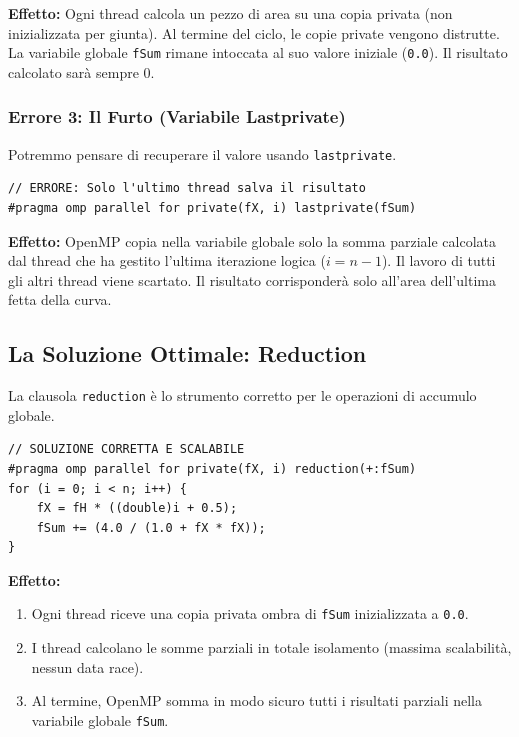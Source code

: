 \textbf{Effetto:} Ogni thread calcola un pezzo di area su una copia privata (non inizializzata per giunta). Al termine del ciclo, le copie private vengono distrutte. La variabile globale \texttt{fSum} rimane intoccata al suo valore iniziale (\texttt{0.0}). Il risultato calcolato sarà sempre $0$.

\subsubsection{Errore 3: Il Furto (Variabile Lastprivate)}
Potremmo pensare di recuperare il valore usando \texttt{lastprivate}.
\begin{verbatim}
// ERRORE: Solo l'ultimo thread salva il risultato
#pragma omp parallel for private(fX, i) lastprivate(fSum)
\end{verbatim}

\textbf{Effetto:} OpenMP copia nella variabile globale solo la somma parziale calcolata dal thread che ha gestito l'ultima iterazione logica ($i = n-1$). Il lavoro di tutti gli altri thread viene scartato. Il risultato corrisponderà solo all'area dell'ultima fetta della curva.

\subsection{La Soluzione Ottimale: Reduction}
La clausola \texttt{reduction} è lo strumento corretto per le operazioni di accumulo globale.
\begin{verbatim}
// SOLUZIONE CORRETTA E SCALABILE
#pragma omp parallel for private(fX, i) reduction(+:fSum)
for (i = 0; i < n; i++) {
    fX = fH * ((double)i + 0.5);
    fSum += (4.0 / (1.0 + fX * fX));
}
\end{verbatim}

\textbf{Effetto:} 
\begin{enumerate}
    \item Ogni thread riceve una copia privata ombra di \texttt{fSum} inizializzata a \texttt{0.0}.
    \item I thread calcolano le somme parziali in totale isolamento (massima scalabilità, nessun data race).
    \item Al termine, OpenMP somma in modo sicuro tutti i risultati parziali nella variabile globale \texttt{fSum}.
\end{enumerate}






